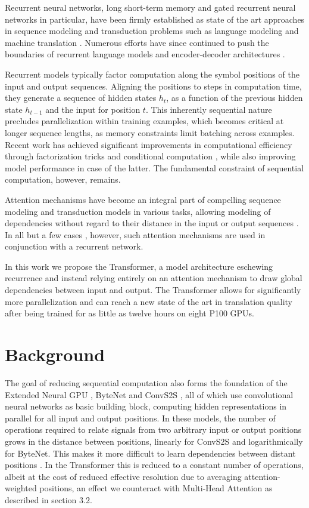 \documentclass[12pt, a4paper]{article}
\begin{document}
Recurrent neural networks, long short-term memory \cite{13} and gated recurrent \cite{7} neural networks in particular, have been firmly established as state of the art approaches in sequence modeling and transduction problems such as language modeling and machine translation \cite{35, 2, 5}. Numerous efforts have since continued to push the boundaries of recurrent language models and encoder-decoder architectures \cite{38, 24, 15}.

Recurrent models typically factor computation along the symbol positions of the input and output sequences. Aligning the positions to steps in computation time, they generate a sequence of hidden states $h_t$, as a function of the previous hidden state $h_{t-1}$ and the input for position $t$. This inherently sequential nature precludes parallelization within training examples, which becomes critical at longer sequence lengths, as memory constraints limit batching across examples. Recent work has achieved significant improvements in computational efficiency through factorization tricks \cite{21} and conditional computation \cite{32}, while also improving model performance in case of the latter. The fundamental constraint of sequential computation, however, remains.

Attention mechanisms have become an integral part of compelling sequence modeling and transduction models in various tasks, allowing modeling of dependencies without regard to their distance in the input or output sequences \cite{2, 19}. In all but a few cases \cite{27}, however, such attention mechanisms are used in conjunction with a recurrent network.

In this work we propose the Transformer, a model architecture eschewing recurrence and instead relying entirely on an attention mechanism to draw global dependencies between input and output. The Transformer allows for significantly more parallelization and can reach a new state of the art in translation quality after being trained for as little as twelve hours on eight P100 GPUs.

\section{Background}

The goal of reducing sequential computation also forms the foundation of the Extended Neural GPU \cite{16}, ByteNet \cite{18} and ConvS2S \cite{9}, all of which use convolutional neural networks as basic building block, computing hidden representations in parallel for all input and output positions. In these models, the number of operations required to relate signals from two arbitrary input or output positions grows in the distance between positions, linearly for ConvS2S and logarithmically for ByteNet. This makes it more difficult to learn dependencies between distant positions \cite{12}. In the Transformer this is reduced to a constant number of operations, albeit at the cost of reduced effective resolution due to averaging attention-weighted positions, an effect we counteract with Multi-Head Attention as described in section 3.2.
\end{document}
